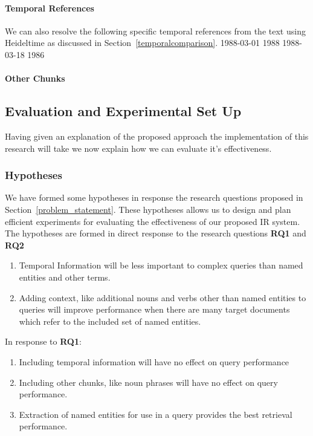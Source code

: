 \documentclass{mprop}
\begin{document}
\paragraph{Temporal References}
We can also resolve the following specific temporal references from the text using Heideltime as discussed in Section~\ref{temporalcomparison}.
1988-03-01
1988
1988-03-18
1986

\paragraph{Other Chunks}

\subsection{Evaluation and Experimental Set Up}
Having given an explanation of the proposed approach the implementation of this research will take we now explain how we can evaluate it's effectiveness.

\subsubsection{Hypotheses}
We have formed some hypotheses in response the research questions proposed in Section~\ref{problem_statement}. These hypotheses allows us to design and plan efficient experiments for evaluating the effectiveness of our proposed IR system. The hypotheses are formed in direct response to the research questions \textbf{RQ1} and \textbf{RQ2}

\begin{enumerate}[label=\textbf{Hyp.\arabic*}]
\item Temporal Information will be less important to complex queries than named entities and other terms.
\item Adding context, like additional nouns and verbs other than named entities to queries will improve performance when there are many target documents which refer to the included set of named entities.
\end{enumerate}

In response to \textbf{RQ1}:

\begin{enumerate}[label=\textbf{Null Hyp.\arabic*}]
\item Including temporal information will have no effect on query performance
\item Including other chunks, like noun phrases will have no effect on query performance.
\item Extraction of named entities for use in a query provides the best retrieval performance.
\setcounter{nullhyp}{\value{enumi}}
\end{enumerate}
\end{document}
